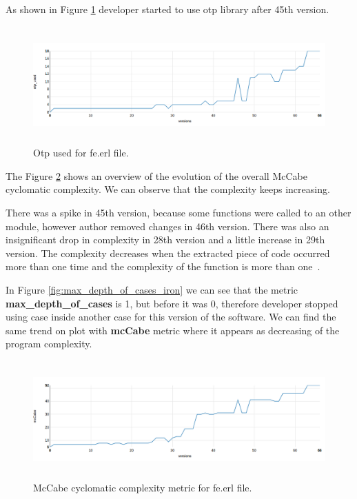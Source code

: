 As shown in Figure \ref{fig:otp_iron} developer started to use otp library after 45th version. 

\begin{figure}[h]
	\centering
	\includegraphics[height=45mm]{figures/otp_iron.png}
	\caption{Otp used for fe.erl file.}
	\label{fig:otp_iron}
\end{figure}

The Figure \ref{fig:mcCabe_iron} shows an overview of the evolution of the overall McCabe cyclomatic complexity. We can observe that the complexity keeps increasing.

There was a spike in 45th version, because some functions were called to an other module, however author removed changes in 46th version. There was also an insignificant drop in complexity in 28th version and a little increase in 29th version. The  complexity decreases  when  the  extracted  piece  of code occurred more than one time and the complexity of the function is more than one~\cite{mcCabe}. 

In Figure \ref{fig:max_depth_of_cases_iron} we can see that the metric \textbf{max\_depth\_of\_cases} is 1, but before it was 0, therefore developer stopped using case inside another case for this version of the software. We can find the same trend on plot with \textbf{mcCabe} metric where it appears as decreasing of the program complexity.  

\begin{figure}[h]
	\centering
	\includegraphics[height=45mm]{figures/mcCabe_iron.png}
	\caption{McCabe cyclomatic complexity metric for fe.erl file.}
	\label{fig:mcCabe_iron}
\end{figure}

